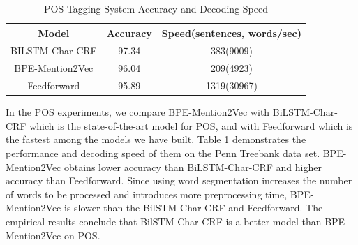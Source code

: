 \begin{table}[]
\centering
\caption{POS Tagging System Accuracy and Decoding Speed}
\label{table:pos-mention2vec}
\begin{tabular}{|c|c|c|}
\hline
Model   & Accuracy     & Speed(sentences, words/sec) \\ \hline
BILSTM-Char-CRF & 97.34  & 383(9009)    \\ \hline
BPE-Mention2Vec & 96.04  & 209(4923)    \\ \hline
Feedforward     & 95.89  & 1319(30967)   \\ \hline
\end{tabular}
\end{table}

In the POS experiments, we compare BPE-Mention2Vec with BiLSTM-Char-CRF which is the state-of-the-art model for POS, and with Feedforward which is the fastest among the models we have built. Table \ref{table:pos-mention2vec} demonstrates the performance and decoding speed of them on the Penn Treebank data set. BPE-Mention2Vec obtains lower accuracy than BiLSTM-Char-CRF and higher accuracy than Feedforward. Since using word segmentation increases the number of words to be processed and introduces more preprocessing time, BPE-Mention2Vec is slower than the BilSTM-Char-CRF and Feedforward. The empirical results conclude that BilSTM-Char-CRF is a better model than BPE-Mention2Vec on POS. 
